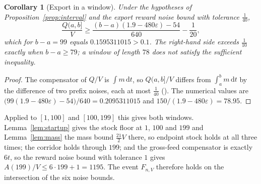 \documentclass[11pt,letterpaper]{article}
\theoremstyle{plain}
\newtheorem{corollary}[theorem]{Corollary}
\theoremstyle{definition}
\theoremstyle{remark}
\numberwithin{equation}{section}
\newcommand{\eps}{\varepsilon}
\newcommand{\dd}{\,\mathrm d}
\begin{document}
\begin{corollary}[Export in a window]\label{cor:export}
Under the hypotheses of Proposition~\ref{prop:interval} and the export reward noise bound with tolerance $\tfrac1{40}$,
\begin{equation}\label{eq:margin}
 \frac{Q(a,b]}V\ge\frac{(b-a)(1.9-480\eps)-54}{640}-\frac1{20},
\end{equation}
which for $b-a=99$ equals $0.1595311015>0.1$. The right-hand side exceeds $\tfrac1{10}$ exactly when $b-a\ge79$; a window of length $78$ does not satisfy the sufficient inequality.
\end{corollary}
\begin{proof}
The compensator of $Q/V$ is $\int m\dd t$, so $Q(a,b]/V$ differs from $\int_a^bm\dd t$ by the difference of two prefix noises, each at most $\tfrac1{40}$ (). The numerical values are $\bigl(99(1.9-480\eps)-54\bigr)/640=0.2095311015$ and $150/(1.9-480\eps)=78.95$.
\end{proof}

Applied to $[1,100]$ and $[100,199]$ this gives both windows. Lemma~\ref{lem:startup} gives the stock floor at $1$, $100$ and $199$ and Lemma~\ref{lem:mass} the mass bound $\tfrac{21}2V$ there, so endpoint stock holds at all three times; the corridor holds through $199$; and the gross-feed compensator is exactly $6t$, so the reward noise bound with tolerance $1$ gives $A(199)/V\le6\cdot199+1=1195$. The event $F_{n,V}$ therefore holds on the intersection of the six noise bounds.
\end{document}
